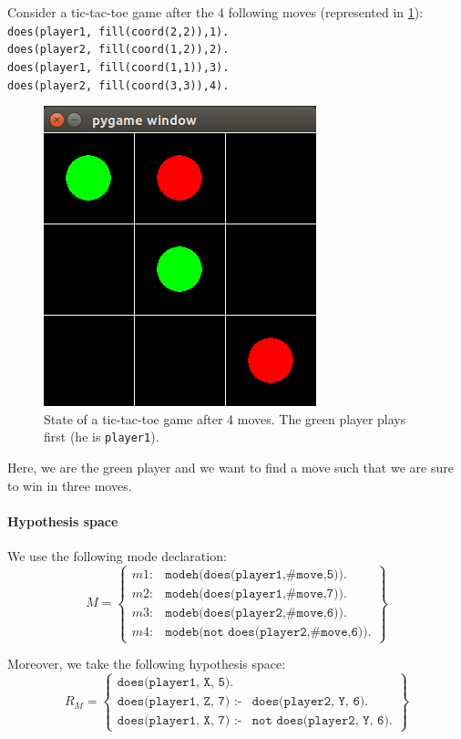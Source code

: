 \documentclass[12pt,twoside]{report}
\begin{document}
Consider a tic-tac-toe game after the 4 following moves (represented in \ref{fig:ttt_ex}):\newline
\texttt{does(player1, fill(coord(2,2)),1).\\
does(player2, fill(coord(1,2)),2).\\
does(player1, fill(coord(1,1)),3).\\
does(player2, fill(coord(3,3)),4).}

\begin{figure}[h]
\centering
\includegraphics[width = 0.3\hsize]{figures/ttt_example.png}
\caption{State of a tic-tac-toe game after 4 moves. The green player plays first (he is \texttt{player1}).}
\label{fig:ttt_ex}
\end{figure}

Here, we are the green player and we want to find a move such that we are sure to win in three moves.

\paragraph{Hypothesis space}

We use the following mode declaration:
\[ M=
\begin{Bmatrix} 
m1 :& \texttt{modeh(does(player1,\#move,5)).} \\ 
m2 :& \texttt{modeh(does(player1,\#move,7)).}\\
m3 :& \texttt{modeb(does(player2,\#move,6)).}\\
m4 :& \texttt{modeb(not does(player2,\#move,6)).}
\end{Bmatrix}
\]

Moreover, we take the following hypothesis space:
\[ R_M=
\begin{Bmatrix}
\texttt{does(player1, X, 5).} \\ 
\texttt{does(player1, Z, 7) :-} & \texttt{does(player2, Y, 6).}\\
\texttt{does(player1, X, 7) :-}  & \texttt{not does(player2, Y, 6).}
\end{Bmatrix}
\]
\end{document}
